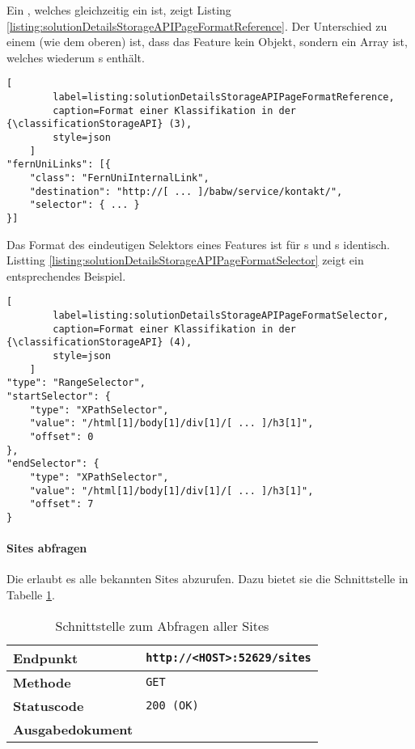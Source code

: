     Ein {}, welches gleichzeitig ein {\collectionFeature} ist,
    zeigt Listing \ref{listing:solutionDetailsStorageAPIPageFormatReference}.
    Der Unterschied zu einem {\scalarFeature} (wie dem oberen) ist,
    dass das Feature kein Objekt, sondern ein Array ist,
    welches wiederum {\scalarFeature}s enthält.

    \begin{lstlisting}[
        label=listing:solutionDetailsStorageAPIPageFormatReference,
        caption=Format einer Klassifikation in der {\classificationStorageAPI} (3),
        style=json
    ]
"fernUniLinks": [{
    "class": "FernUniInternalLink",
    "destination": "http://[ ... ]/babw/service/kontakt/",
    "selector": { ... }
}]
    \end{lstlisting}

    Das Format des eindeutigen Selektors eines Features ist für {\contentFeature}s
    und {}s identisch.
    Listting \ref{listing:solutionDetailsStorageAPIPageFormatSelector} zeigt ein entsprechendes Beispiel.

    \begin{lstlisting}[
        label=listing:solutionDetailsStorageAPIPageFormatSelector,
        caption=Format einer Klassifikation in der {\classificationStorageAPI} (4),
        style=json
    ]
"type": "RangeSelector",
"startSelector": {
    "type": "XPathSelector",
    "value": "/html[1]/body[1]/div[1]/[ ... ]/h3[1]",
    "offset": 0
},
"endSelector": {
    "type": "XPathSelector",
    "value": "/html[1]/body[1]/div[1]/[ ... ]/h3[1]",
    "offset": 7
}
    \end{lstlisting}

    \paragraph{Sites abfragen}
    Die {\classificationStorageAPI} erlaubt es alle bekannten Sites abzurufen.
    Dazu bietet sie die Schnittstelle in Tabelle \ref{table:getSitesInterface}.

    \begin{table}[htb]
        \centering
        \begin{tabular}{|l|l|}
        \hline
        \textbf{Endpunkt} & \texttt{http://<HOST>:52629/sites}\\
        \hline
        \textbf{Methode} & \texttt{GET}\\
        \hline
        \textbf{Statuscode} & \texttt{200 (OK)}\\
        \hline
        \textbf{Ausgabedokument} & \\
        \hline
        \end{tabular}
        \caption{Schnittstelle zum Abfragen aller Sites}
        \label{table:getSitesInterface}
    \end{table}


